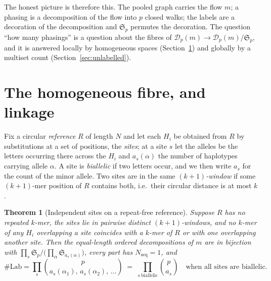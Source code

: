 \documentclass[11pt]{article}
\theoremstyle{plain}
\newtheorem{theorem}{Theorem}
\theoremstyle{definition}
\theoremstyle{remark}
\newcommand{\Nseq}{N_{\mathrm{seq}}}
\newcommand{\Lab}{\#\mathrm{Lab}}
\newcommand{\Sym}{\mathfrak{S}}
\begin{document}
The honest picture is therefore this. The pooled graph carries the flow $m$; a phasing is a
decomposition of the flow into $p$ closed walks; the labels are a decoration of the
decomposition and $\Sym_p$ permutes the decoration. The question ``how many phasings'' is a
question about the fibres of $\mathcal D_p(m)\to\mathcal D_p(m)/\Sym_p$, and it is answered
locally by homogeneous spaces (Section~\ref{sec:sites}) and globally by a multiset count
(Section~\ref{sec:unlabelled}).

\section{The homogeneous fibre, and linkage}\label{sec:sites}

Fix a circular \emph{reference} $R$ of length $N$ and let each $H_i$ be obtained from $R$ by
substitutions at a set of positions, the \emph{sites}; at a site $s$ let the alleles be the
letters occurring there across the $H_i$ and $a_s(\alpha)$ the number of haplotypes carrying
allele $\alpha$. A site is \emph{biallelic} if two letters occur, and we then write $a_s$ for
the count of the minor allele. Two sites are in the same \emph{$(k{+}1)$-window} if some
$(k{+}1)$-mer position of $R$ contains both, i.e.\ their circular distance is at most $k$.

\begin{theorem}[Independent sites on a repeat-free reference]\label{thm:sites}
Suppose $R$ has no repeated $k$-mer, the sites lie in pairwise distinct $(k{+}1)$-windows, and
no $k$-mer of any $H_i$ overlapping a site coincides with a $k$-mer of $R$ or with one
overlapping another site. Then the equal-length ordered decompositions of $m$ are in bijection
with $\prod_s\Sym_p/\big(\prod_\alpha\Sym_{a_s(\alpha)}\big)$, every part has $\Nseq=1$, and
\[
  \Lab=\prod_s\binom{p}{a_s(\alpha_1),\,a_s(\alpha_2),\,\dots}
  \;=\;\prod_{s\ \text{biallelic}}\binom{p}{a_s}\quad\text{when all sites are biallelic.}
\]
\end{theorem}
\end{document}

